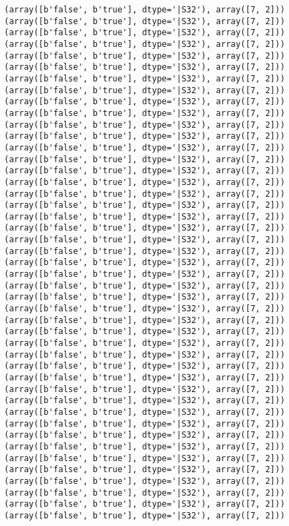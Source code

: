 \documentclass[11pt]{article}
\begin{document}
\begin{Verbatim}[commandchars=\\\{\}]
(array([b'false', b'true'], dtype='|S32'), array([7, 2]))
(array([b'false', b'true'], dtype='|S32'), array([7, 2]))
(array([b'false', b'true'], dtype='|S32'), array([7, 2]))
(array([b'false', b'true'], dtype='|S32'), array([7, 2]))
(array([b'false', b'true'], dtype='|S32'), array([7, 2]))
(array([b'false', b'true'], dtype='|S32'), array([7, 2]))
(array([b'false', b'true'], dtype='|S32'), array([7, 2]))
(array([b'false', b'true'], dtype='|S32'), array([7, 2]))
(array([b'false', b'true'], dtype='|S32'), array([7, 2]))
(array([b'false', b'true'], dtype='|S32'), array([7, 2]))
(array([b'false', b'true'], dtype='|S32'), array([7, 2]))
(array([b'false', b'true'], dtype='|S32'), array([7, 2]))
(array([b'false', b'true'], dtype='|S32'), array([7, 2]))
(array([b'false', b'true'], dtype='|S32'), array([7, 2]))
(array([b'false', b'true'], dtype='|S32'), array([7, 2]))
(array([b'false', b'true'], dtype='|S32'), array([7, 2]))
(array([b'false', b'true'], dtype='|S32'), array([7, 2]))
(array([b'false', b'true'], dtype='|S32'), array([7, 2]))
(array([b'false', b'true'], dtype='|S32'), array([7, 2]))
(array([b'false', b'true'], dtype='|S32'), array([7, 2]))
(array([b'false', b'true'], dtype='|S32'), array([7, 2]))
(array([b'false', b'true'], dtype='|S32'), array([7, 2]))
(array([b'false', b'true'], dtype='|S32'), array([7, 2]))
(array([b'false', b'true'], dtype='|S32'), array([7, 2]))
(array([b'false', b'true'], dtype='|S32'), array([7, 2]))
(array([b'false', b'true'], dtype='|S32'), array([7, 2]))
(array([b'false', b'true'], dtype='|S32'), array([7, 2]))
(array([b'false', b'true'], dtype='|S32'), array([7, 2]))
(array([b'false', b'true'], dtype='|S32'), array([7, 2]))
(array([b'false', b'true'], dtype='|S32'), array([7, 2]))
(array([b'false', b'true'], dtype='|S32'), array([7, 2]))
(array([b'false', b'true'], dtype='|S32'), array([7, 2]))
(array([b'false', b'true'], dtype='|S32'), array([7, 2]))
(array([b'false', b'true'], dtype='|S32'), array([7, 2]))
(array([b'false', b'true'], dtype='|S32'), array([7, 2]))
(array([b'false', b'true'], dtype='|S32'), array([7, 2]))
(array([b'false', b'true'], dtype='|S32'), array([7, 2]))
(array([b'false', b'true'], dtype='|S32'), array([7, 2]))
(array([b'false', b'true'], dtype='|S32'), array([7, 2]))
(array([b'false', b'true'], dtype='|S32'), array([7, 2]))
(array([b'false', b'true'], dtype='|S32'), array([7, 2]))
(array([b'false', b'true'], dtype='|S32'), array([7, 2]))
(array([b'false', b'true'], dtype='|S32'), array([7, 2]))
(array([b'false', b'true'], dtype='|S32'), array([7, 2]))
(array([b'false', b'true'], dtype='|S32'), array([7, 2]))

\end{Verbatim}
\end{document}
